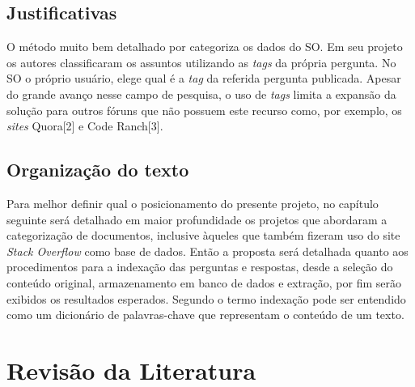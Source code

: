 \documentclass[10pt,a4paper,final]{article}
\begin{document}
    \subsection{Justificativas}

O método muito bem detalhado por \cite{Arash2016} categoriza os dados do SO. Em seu projeto os autores classificaram os assuntos utilizando as \textit{tags} da própria pergunta. No SO o próprio usuário, elege qual é a \textit{tag} da referida pergunta publicada. Apesar do grande avanço nesse campo de pesquisa, o uso de \textit{tags} limita a expansão da solução para outros fóruns que não possuem este recurso como, por exemplo, os \textit{sites} Quora[2] e Code Ranch[3].

   \subsection{Organização do texto}

Para melhor definir qual o posicionamento do presente projeto, no capítulo seguinte será detalhado em maior profundidade os projetos que abordaram a categorização de documentos, inclusive àqueles que também fizeram uso do site \textit{Stack Overflow} como base de dados. Então a proposta será detalhada quanto aos procedimentos para a indexação das perguntas e respostas, desde a seleção do conteúdo original, armazenamento em banco de dados e extração, por fim serão exibidos os resultados esperados. Segundo \cite{Kaleta2014} o termo indexação pode ser entendido como um dicionário de palavras-chave que representam o conteúdo de um texto.	

 \section{Revisão da Literatura}
\end{document}
